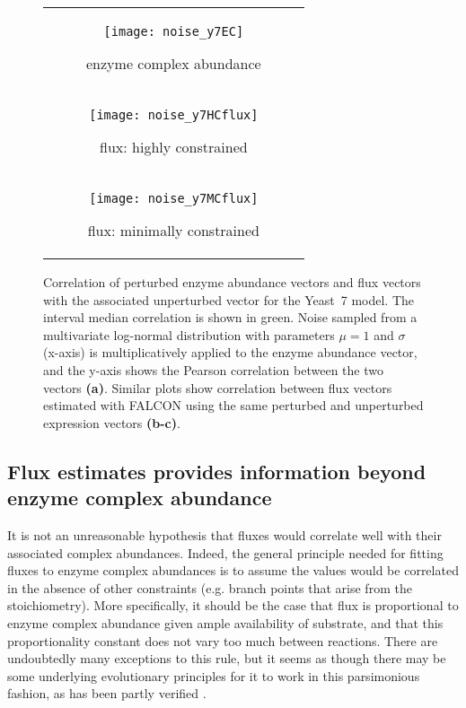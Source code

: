 \begin{figure}
\centering
\begin{tabular}{c}
  \begin{subfigure}[b]{0.5\textwidth}
  \texttt{[image: noise\_y7EC]}
  \caption{enzyme complex abundance} \label{fig:ExpSens:A}
  \end{subfigure}
\\
  \begin{subfigure}[b]{0.5\textwidth}
  \texttt{[image: noise\_y7HCflux]}
  \caption{flux: highly constrained} \label{fig:ExpSens:B}
  \end{subfigure} 
\\
  \begin{subfigure}[b]{0.5\textwidth}
  \texttt{[image: noise\_y7MCflux]}
  \caption{flux: minimally constrained} \label{fig:ExpSens:C}
  \end{subfigure} 
\\
\end{tabular}
\vspace{-4mm} 
\caption{
Correlation of perturbed enzyme abundance vectors and flux
vectors with the associated unperturbed vector for the 
Yeast~7 model. The interval median
correlation is shown in green. Noise sampled from a multivariate
log-normal distribution with parameters $\mu=1$ and $\sigma$ (x-axis) is
multiplicatively applied to the enzyme abundance vector, and the
y-axis shows the Pearson correlation between the two vectors
\textbf{(a)}. Similar plots show correlation between flux vectors estimated
with FALCON using the same perturbed and unperturbed expression
vectors \textbf{(b-c)}.}
\label{fig:ExpSens}
\end{figure}


\subsection{Flux estimates provides information beyond enzyme complex abundance}
It is not an unreasonable hypothesis that fluxes would correlate well
with their associated complex abundances. Indeed, the general
principle needed for fitting fluxes to enzyme complex abundances is to
assume the values would be correlated in the absence of other
constraints (e.g. branch points that arise from the
stoichiometry). More specifically, it should be the case that flux is
proportional to enzyme complex abundance given ample availability of
substrate, and that this proportionality constant does not vary too
much between reactions.  There are undoubtedly many exceptions to this
rule, but it seems as though there may be some underlying evolutionary
principles for it to work in this parsimonious fashion, as has been
partly verified \citep{Bennett2009}.

